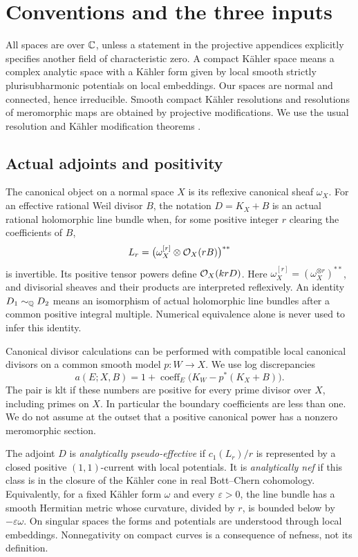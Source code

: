 \section{Conventions and the three inputs}\label{sec:premises}

All spaces are over \(\mathbb{C}\), unless a statement in the projective
appendices explicitly specifies another field of characteristic zero.
A compact K\"ahler space means a complex analytic space with a
K\"ahler form given by local smooth strictly plurisubharmonic potentials
on local embeddings. Our spaces are normal and connected, hence
irreducible. Smooth compact K\"ahler resolutions and resolutions of
meromorphic maps are obtained by projective modifications. We use the
usual resolution and K\"ahler modification theorems
\cite{HironakaResolution,VarouchasKahler}.

\subsection{Actual adjoints and positivity}

The canonical object on a normal space \(X\) is its reflexive canonical
sheaf \(\omega_X\). For an effective rational Weil divisor \(B\), the
notation \(D=K_X+B\) is an actual rational holomorphic line bundle
when, for some positive integer \(r\) clearing the coefficients of
\(B\),
\[
 L_r=\bigl(\omega_X^{[r]}\otimes\mathcal{O}_X(rB)\bigr)^{**}
\]
is invertible. Its positive tensor powers define \(\mathcal{O}_X(krD)\).
Here \(\omega_X^{[r]}=(\omega_X^{\otimes r})^{**}\), and divisorial
sheaves and their products are interpreted reflexively. An identity
\(D_1\sim_{\mathbb{Q}}D_2\) means an isomorphism of actual holomorphic line
bundles after a common positive integral multiple. Numerical equivalence
alone is never used to infer this identity.

Canonical divisor calculations can be performed with compatible local
canonical divisors on a common smooth model \(p:W\to X\). We use log
discrepancies
\begin{equation}\label{eq:discrepancy}
 a(E;X,B)=1+\operatorname{coeff}_E
       \bigl(K_W-p^*(K_X+B)\bigr).
\end{equation}
The pair is klt if these numbers are positive for every prime divisor
over \(X\), including primes on \(X\). In particular the boundary
coefficients are less than one. We do not assume at the outset that a
positive canonical power has a nonzero meromorphic section.

The adjoint \(D\) is \emph{analytically pseudo-effective} if
\(c_1(L_r)/r\) is represented by a closed positive \((1,1)\)-current
with local potentials. It is \emph{analytically nef} if this class is
in the closure of the K\"ahler cone in real Bott--Chern cohomology.
Equivalently, for a fixed K\"ahler form \(\omega\) and every
\(\varepsilon>0\), the line bundle has a smooth Hermitian metric
whose curvature, divided by \(r\), is bounded below by
\(-\varepsilon\omega\). On singular spaces the forms and potentials
are understood through local embeddings. Nonnegativity on compact
curves is a consequence of nefness, not its definition.

